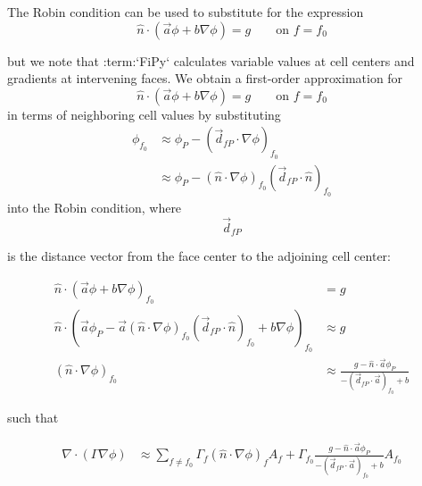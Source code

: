 \documentclass{article}
\begin{document}
The Robin condition can be used to substitute for the expression
\begin{equation*}
\hat{n}\cdot\left(\vec{a}\phi + b\nabla\phi\right) = g\qquad\text{on $f=f_0$}
\end{equation*}

but we note that :term:`FiPy` calculates variable values at cell centers and gradients at intervening faces. We obtain a first-order approximation for
\begin{equation*}
\hat{n}\cdot\left(\vec{a}\phi + b\nabla\phi\right) = g\qquad\text{on $f=f_0$}
\end{equation*}
in terms of neighboring cell values by substituting
\begin{equation*}
\begin{aligned}
     \phi_{f_0} &\approx \phi_P - \left(\vec{d}_{fP}\cdot\nabla\phi\right)_{f_0}
     \\
     &\approx \phi_P - \left(\hat{n}\cdot\nabla\phi\right)_{f_0}\left(\vec{d}_{fP}\cdot\hat{n}\right)_{f_0}
\end{aligned}
\end{equation*}
into the Robin condition, where
\begin{equation*}
\vec{d}_{fP}
\end{equation*} 

is the distance vector from the face center to the adjoining cell center:

\begin{equation*}
\begin{aligned}
     \hat{n}\cdot\left(\vec{a} \phi + b \nabla\phi\right)_{f_0} &= g \\
     \hat{n}\cdot\left(\vec{a} \phi_P
     - \vec{a} \left(\hat{n}\cdot\nabla\phi\right)_{f_0}\left(\vec{d}_{fP}\cdot\hat{n}\right)_{f_0}
     + b \nabla\phi\right)_{f_0} &\approx g \\
     \left(\hat{n}\cdot\nabla\phi\right)_{f_0}
     &\approx \frac{g - \hat{n}\cdot\vec{a} \phi_P}{-\left(\vec{d}_{fP}\cdot\vec{a}\right)_{f_0} + b}
\end{aligned}
\end{equation*} 

such that

\begin{equation*}
\begin{aligned}
    \nabla\cdot\left(\Gamma\nabla\phi\right) &\approx
    \sum_{f\neq f_0} \Gamma_f \left(\hat{n}\cdot\nabla\phi\right)_f A_f
    + \Gamma_{f_0} \frac{g - \hat{n}\cdot\vec{a} \phi_P}
                        {-\left(\vec{d}_{fP}\cdot\vec{a}\right)_{f_0} + b} A_{f_0}
\end{aligned}
\end{equation*} 
\end{document}

